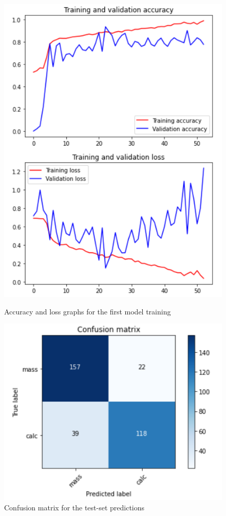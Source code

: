 \documentclass[11pt,a4paper,oneside]{article}
\begin{document}
\begin{figure}[hb]
\centering
	\begin{minipage}[c]{.4\textwidth}
		\centering\setlength{\captionmargin}{0pt}%
		\includegraphics[width=.9\textwidth]{images/scratch_accuracy}
		\caption{Accuracy and loss graphs for the first model training}
		\label{fig:scratch_accuracy}
	\end{minipage}
	\hspace{5mm}%
	\begin{minipage}[c]{.4\textwidth}
		\centering\setlength{\captionmargin}{0pt}%
		\includegraphics[width=.9\textwidth]{images/scratch_matrix}
		\caption{Confusion matrix for the test-set predictions}
		\label{fig:scratch_matrix}
	\end{minipage}%
\end{figure}
\end{document}
